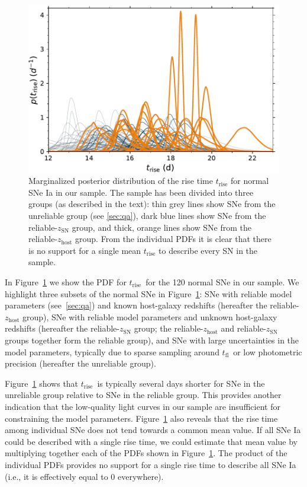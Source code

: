 \documentclass[twocolumn]{aastex63}
\newcommand{\tfl}{$t_\mathrm{fl}$}
\newcommand{\trise}{$t_\mathrm{rise}$}
\begin{document}
\begin{figure}
    \centering
    \includegraphics[width=1\linewidth]{./figures/rise_time.pdf}
    \caption{Marginalized posterior distribution of the rise time
    $t_\mathrm{rise}$ for normal SNe Ia in our sample. The sample has been
    divided into three groups (as described in the text): thin grey lines show
    SNe from the unreliable group (see \ref{sec:qa}), dark blue lines show SNe
    from the reliable-$z_\mathrm{SN}$ group, and thick, orange lines show SNe
    from the reliable-$z_\mathrm{host}$ group. From the individual PDFs it is
    clear that there is no support for a single mean $t_\mathrm{rise}$ to
    describe every SN in the sample.}
    \label{fig:rise_time}
\end{figure}

In Figure~\ref{fig:rise_time} we show the PDF for \trise\ for the 120 normal
SNe in our sample. We highlight three subsets of the normal SNe in
Figure~\ref{fig:rise_time}: SNe with reliable model parameters
(see~\ref{sec:qa}) and known host-galaxy redshifts (hereafter the
reliable-$z_\mathrm{host}$ group), SNe with reliable model parameters and
unknown host-galaxy redshifts (hereafter the reliable-$z_\mathrm{SN}$ group;
the reliable-$z_\mathrm{host}$ and reliable-$z_\mathrm{SN}$ groups together
form the reliable group), and SNe with large uncertainties in the model
parameters, typically due to sparse sampling around \tfl\ or low photometric
precision (hereafter the unreliable group).

Figure~\ref{fig:rise_time} shows that \trise\ is typically several days
shorter for SNe in the unreliable group relative to SNe in the reliable group.
This provides another indication that the low-quality light curves in our
sample are insufficient for constraining the model parameters.
Figure~\ref{fig:rise_time} also reveals that the rise time among individual
SNe does not tend towards a common mean value. If all SNe Ia could be
described with a single rise time, we could estimate that mean value by
multiplying together each of the PDFs shown in Figure~\ref{fig:rise_time}. The
product of the individual PDFs provides no support for a single rise time to
describe all SNe Ia (i.e., it is effectively equal to 0 everywhere).
\end{document}
